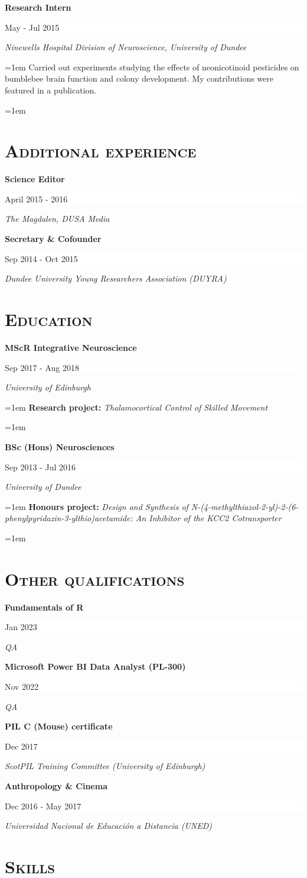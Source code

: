 \documentclass[paper=a4,fontsize=11pt]{scrartcl}
\newcommand{\sepspace}{\vspace*{1em}}
\newcommand{\NewPart}[1]{\section*{\textsc{#1}}} %
\newcommand{\ExperienceEntry}[5]{ %
		\noindent \textbf{#1} \hfill %
		\colorbox{White}{
            \parbox{9em}{
			\hfill\color{Black}#2}} \par %
		\noindent \textit{#3} \par %
		\noindent\hangindent=1em\hangafter=0 \small #4 %
		\normalsize \par
		\hangindent=1em\hangafter=1 \small #5 \par} %
\newcommand{\ShortEntry}[3]{ %
		\noindent \textbf{#1} \hfill %
		\colorbox{White}{
            \parbox{9em}{
			\hfill\color{Black}#2}} \par %
		\noindent \textit{#3} \par} %
\begin{document}
\ExperienceEntry{Research Intern}{May - Jul 2015}{Ninewells Hospital Division of Neuroscience, University of Dundee}{Carried out experiments studying the effects of neonicotinoid pesticides on bumblebee brain function and colony development. My contributions were featured in a publication.
}{}


\NewPart{Additional experience}

\ShortEntry{Science Editor}{April 2015 - 2016}{The Magdalen, DUSA Media}
\sepspace

\ShortEntry{Secretary \& Cofounder}{Sep 2014 - Oct 2015}{Dundee University Young Researchers Association (DUYRA)}


\NewPart{Education}

\ExperienceEntry{MScR Integrative Neuroscience}{Sep 2017 - Aug 2018}{University of Edinburgh}{\textbf{Research project:} \textit{Thalamocortical Control of Skilled Movement}}{}
\sepspace

\ExperienceEntry{BSc (Hons) Neurosciences}{Sep 2013 - Jul 2016}{University of Dundee}{\textbf{Honours project:} \textit{Design and Synthesis of N-(4-methylthiazol-2-yl)-2-(6-phenylpyridazin-3-ylthio)acetamide: An Inhibitor of the KCC2 Cotransporter}}{}
\sepspace



\NewPart{Other qualifications}
\ShortEntry{Fundamentals of R}{Jan 2023}{QA}
\sepspace

\ShortEntry{Microsoft Power BI Data Analyst (PL-300)}{Nov 2022}{QA}
\sepspace

\ShortEntry{PIL C (Mouse) certificate}{Dec 2017}{ScotPIL Training Committee (University of Edinburgh)}
\sepspace

\ShortEntry{Anthropology \& Cinema}{Dec 2016 - May 2017}{Universidad Nacional de Educación a Distancia (UNED)}
\sepspace


\NewPart{Skills}
\end{document}
